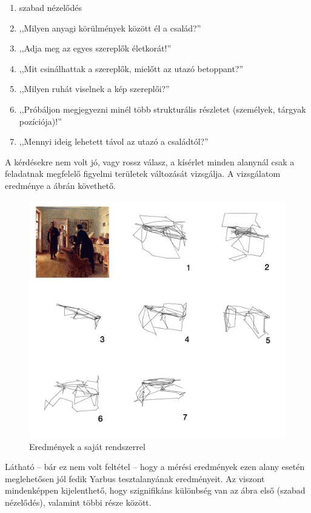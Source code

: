 \begin{enumerate}
 \item szabad nézelődés
 \item ,,Milyen anyagi körülmények között él a család?''
 \item ,,Adja meg az egyes szereplők életkorát!''
 \item ,,Mit csinálhattak a szereplők, mielőtt az utazó betoppant?''
 \item ,,Milyen ruhát viselnek a kép szereplői?''
 \item ,,Próbáljon megjegyezni minél több strukturális részletet (személyek, tárgyak pozíciója)!''
 \item ,,Mennyi ideig lehetett távol az utazó a családtól?''
\end{enumerate}

A kérdésekre nem volt jó, vagy rossz válasz, a kísérlet minden alanynál csak a feladatnak megfelelő figyelmi területek változását vizsgálja. A vizsgálatom eredménye a  ábrán követhető.

\begin{figure}[!ht]
\centering
\includegraphics[width=140mm, keepaspectratio]{figures/yarbus_eredmeny.png}
\caption{Eredmények a saját rendszerrel}
\label{fig:eredmeny}
\end{figure}

Látható -- bár ez nem volt feltétel -- hogy a mérési eredmények ezen alany esetén meglehetősen jól fedik Yarbus tesztalanyának eredményeit. Az viszont mindenképpen kijelenthető, hogy szignifikáns különbség van az ábra első (szabad nézelődés), valamint többi része között.

